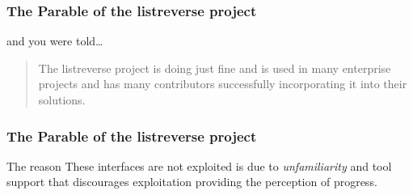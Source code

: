 \begin{frame}
\frametitle{The Parable of the listreverse project}
\begin{block}{and you were told\ldots}
\begin{quote}
The listreverse project is doing just fine and is used in many enterprise projects and has many contributors successfully incorporating it into their solutions.
\end{quote}
\end{block}
\end{frame}

\begin{frame}
\frametitle{The Parable of the listreverse project}
\begin{block}{The reason}
These interfaces are not exploited is due to \emph{unfamiliarity} and tool support that discourages exploitation providing the perception of progress.
\end{block}
\end{frame}

